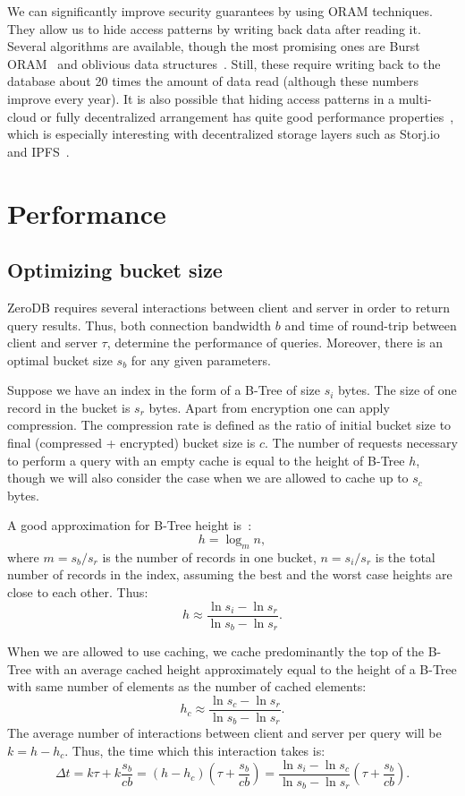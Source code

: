 \documentclass[notitlepage]{revtex4-1}
\begin{document}
We can significantly improve security guarantees by using ORAM techniques.
They allow us to hide access patterns by writing back data after reading it.
Several algorithms are available, though the most promising ones are Burst ORAM~\cite{burst-oram}
and oblivious data structures~\cite{ods-wang-2014}.
Still, these require writing back to the database about 20 times the amount of data read
(although these numbers improve every year).
It is also possible that hiding access patterns in a multi-cloud or fully decentralized arrangement has quite good performance properties~\cite{oram-multicloud},
which is especially interesting with decentralized storage layers such as Storj.io~\cite{storj} and IPFS~\cite{ipfs}.

\section{Performance}

\subsection{Optimizing bucket size}


ZeroDB requires several interactions between client and server in order to return query results.
Thus, both connection bandwidth $b$ and time of round-trip between client and server $\tau$, determine the performance of queries.
Moreover, there is an optimal bucket size $s_b$ for any given parameters.

Suppose we have an index in the form of a B-Tree of size $s_i$ bytes.
The size of one record in the bucket is $s_r$ bytes.
Apart from encryption one can apply compression.
The compression rate is defined as the ratio of initial bucket size to final (compressed + encrypted) bucket size is $c$.
The number of requests necessary to perform a query with an empty cache is equal to the height of B-Tree $h$, though we will also consider the case when we are allowed to cache up to $s_c$ bytes.


A good approximation for B-Tree height is~\cite{wiki:b-tree}:
$$h = \log_m n,$$
where $m = s_b/s_r$ is the number of records in one bucket,
$n = s_i/s_r$ is the total number of records in the index,
assuming the best and the worst case heights are close to each other.
Thus:
$$h \approx \frac{\ln s_i - \ln s_r}{\ln s_b - \ln s_r}.$$

When we are allowed to use caching, we cache predominantly the top of the B-Tree with an average cached height approximately equal to the height of a B-Tree with same number of elements as the number of cached elements:
$$h_c \approx \frac{\ln s_c - \ln s_r}{\ln s_b - \ln s_r}.$$
The average number of interactions between client and server per query will be $k = h - h_c$.
Thus, the time which this interaction takes is:
$$\Delta t = k\tau + k\frac{s_b}{cb} =
\left(h - h_c \right) \left( \tau + \frac{s_b}{cb} \right) =
\frac{\ln s_i - \ln s_c}{\ln s_b - \ln s_r} \left( \tau + \frac{s_b}{cb} \right).$$
\end{document}
